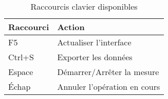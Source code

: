 \documentclass[12pt,a4paper]{article}
\begin{document}
\begin{table}[H]
\centering
\begin{tabular}{|l|l|}
\hline
\textbf{Raccourci} & \textbf{Action} \\
\hline
F5 & Actualiser l'interface \\
\hline
Ctrl+S & Exporter les données \\
\hline
Espace & Démarrer/Arrêter la mesure \\
\hline
Échap & Annuler l'opération en cours \\
\hline
\end{tabular}
\caption{Raccourcis clavier disponibles}
\label{tab:shortcuts}
\end{table}
\end{document}
